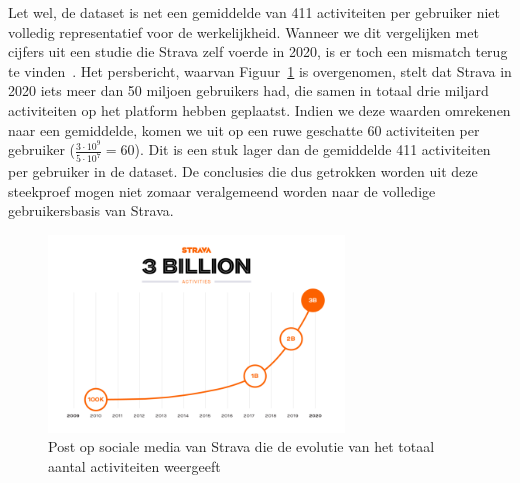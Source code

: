 Let wel, de dataset is net een gemiddelde van 411 activiteiten per gebruiker
niet volledig representatief voor de werkelijkheid. Wanneer we dit vergelijken
met cijfers uit een studie die Strava zelf voerde in 2020, is er toch een
mismatch terug te vinden~\cite{StravaMi72:online}. Het persbericht, waarvan
Figuur~\ref{fig:3billionUsers} is overgenomen, stelt dat Strava in 2020 iets
meer dan 50 miljoen gebruikers had, die samen in totaal drie miljard
activiteiten op het platform hebben geplaatst. Indien we deze waarden omrekenen
naar een gemiddelde, komen we uit op een ruwe geschatte 60 activiteiten per
gebruiker ($\frac{3 \cdot 10^9}{5 \cdot 10^7} = 60 $). Dit is een stuk lager
dan de gemiddelde 411 activiteiten per gebruiker in de dataset. De conclusies
die dus getrokken worden uit deze steekproef mogen niet zomaar veralgemeend
worden naar de volledige gebruikersbasis van Strava.
\begin{figure}[h]
    \centering
    \includegraphics[width=0.7\textwidth]{fig/Strava_3billion.png}
    \caption{Post op sociale media van Strava die de evolutie van het totaal aantal activiteiten weergeeft~\cite{StravaMi72:online}}\label{fig:3billionUsers}
\end{figure}


